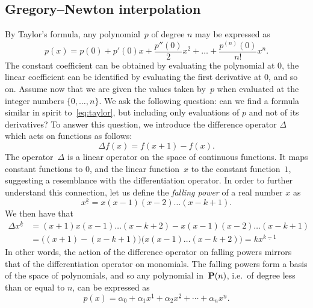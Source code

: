 \subsection{Gregory--Newton interpolation}
By Taylor's formula,
any polynomial~$p$ of degree $n$ may be expressed as
\begin{equation}
    \label{eq:taylor}
    p(x) = p(0) + p'(0) x + \frac{p''(0)}{2} x^2 + \dotsc + \frac{p^{(n)}(0)}{n!} x^n.
\end{equation}
The constant coefficient can be obtained by evaluating the polynomial at 0,
the linear coefficient can be identified by evaluating the first derivative at 0,
and so on.
Assume now that we are given the values taken by~$p$ when evaluated at the integer numbers $\{0, \dotsc, n\}$.
We ask the following question:
can we find a formula similar in spirit to~\eqref{eq:taylor},
but including only evaluations of $p$ and not of its derivatives?
To answer this question, we introduce the difference operator $\Delta$ which acts on functions as follows:
\[
    \Delta f(x) = f(x+1) - f(x).
\]
The operator~$\Delta$ is a linear operator on the space of continuous functions.
It maps constant functions to 0,
and the linear function~$x$ to the constant function~$1$,
suggesting a resemblance with the differentiation operator.
In order to further understand this connection,
let us define the \emph{falling power} of a real number $x$ as
\begin{equation}
    \label{eq:falling_powers}
    x^{\underline{k}} = x (x-1) (x-2) \dots (x-k+1).
\end{equation}
We then have that
\begin{align}
    \nonumber
    \Delta x^{\underline{k}}
    &= (x+1) x (x-1) \dots (x-k+2) - x (x-1) (x-2) \dots (x-k+1) \\
    \label{eq:falling_powers_rule}
    &= \bigl((x+1) - (x-k+1)\bigr) \bigl(x (x-1) \dots (x-k+2)\bigr) = k x^{\underline{k-1}}
\end{align}
In other words,
the action of the difference operator on falling powers mirrors that of the differentiation operator on monomials.
The falling powers form a basis of the space of polynomials,
and so any polynomial in~$\mathbf P(n)$, i.e.\ of degree less than or equal to $n$, can be expressed as
\begin{equation}
    \label{eq:gregory_newton}
    p(x) = \alpha_0 + \alpha_1 x^{\underline{1}} + \alpha_2 x^{\underline{2}} + \dotsb + \alpha_n x^{\underline{n}}.
\end{equation}
